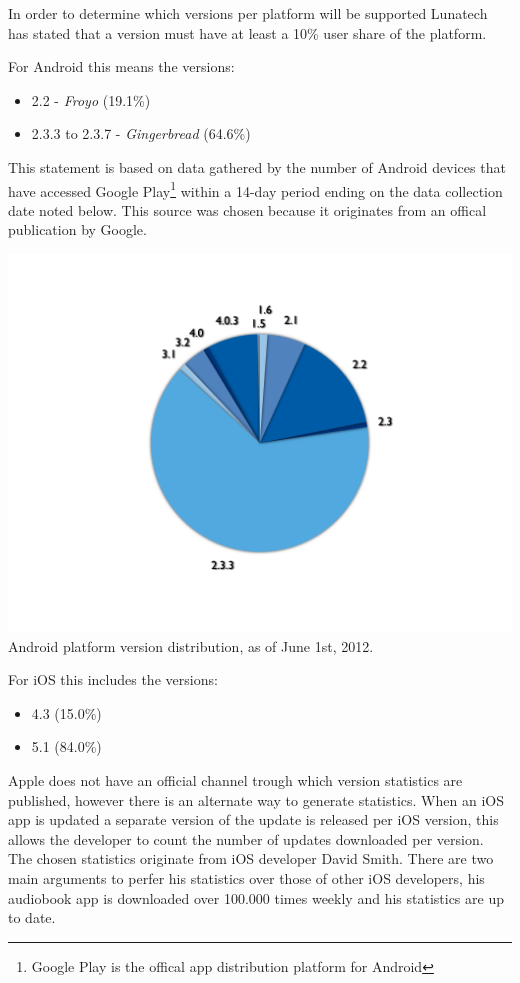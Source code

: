 In order to determine which versions per platform will be supported Lunatech has stated that a version must have at least a 10\% user share of the platform. 

\noindent For Android this means the versions:
\begin{itemize}
\item 2.2 - \emph{Froyo} (19.1\%)
\item 2.3.3 to 2.3.7 - \emph{Gingerbread} (64.6\%)
\end{itemize}
This statement is based on data gathered by the number of Android devices that have accessed Google Play\footnote{Google Play is the offical app distribution platform for Android} within a 14-day period ending on the data collection date noted below. This source was chosen because it originates from an offical publication by Google.\cite{GoogleAndroid2012}

\begin{centering}
\includegraphics[scale=0.25]{images/androidversionchart.png}\\{Android platform version distribution, as of June 1st, 2012.\cite{GoogleAndroid2012}}\\
\end{centering}

\noindent For iOS this includes the versions:
\begin{itemize}
\item 4.3 (15.0\%)
\item 5.1 (84.0\%)
\end{itemize}
Apple does not have an official channel trough which version statistics are published, however there is an alternate way to generate statistics. When an iOS app is updated a separate version of the update is released per iOS version, this allows the developer to count the number of updates downloaded per version. The chosen statistics originate from iOS developer David Smith. There are two main arguments to perfer his statistics over those of other iOS developers, his audiobook app is downloaded over 100.000 times weekly and his statistics are up to date.\cite{Sylvain2012}

